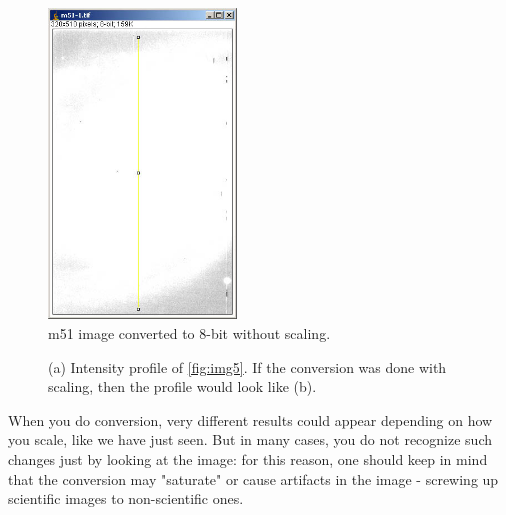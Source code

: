 \begin{indentexercise}{1}
\begin{figure}[H]
\begin{center}
\includegraphics[width=5cm]{fig/CMCIBasicCourse201102-img9.jpg}
\caption{ m51 image converted to 8-bit without scaling.}
\label{fig:img9}
\end{center}
\end{figure}

\begin{figure}[H]
\centering
{}
\caption{ (a) Intensity profile of \ref{fig:img5}. If the conversion was done with scaling, then the profile would look like (b). }
\label{fig:8bitConverted}
\end{figure} 

\end{indentexercise}

When you do conversion, very different results could appear depending on
how you scale, like we have just seen. But in many cases, you do not
recognize such changes just by looking at the image: for this reason,
one should keep in mind that the conversion may
"saturate" or cause artifacts in the image
- screwing up scientific images to non-scientific ones. 


